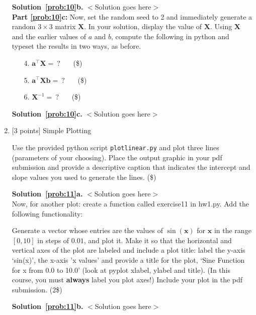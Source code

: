 \documentclass[10pt]{article}
\begin{document}
\begin{enumerate}
{\bf Solution~\ref{prob:10}b.} $<$Solution goes here$>$\\

{\bf Part \ref{prob:10}c:} Now, set the random seed to 2 and immediately generate a random $3 \times 3$ matrix $\mathbf{X}$.  In your solution, display the value of $\mathbf{X}$.  Using $\mathbf{X}$ and the earlier values of $a$ and $b$, compute the following in python and typeset the results in two ways, as before.
\begin{enumerate}
\item[4.] $\mathbf{a}^\top\mathbf{X} = ~?$ ~~~(\$)
\item[5.] $\mathbf{a}^\top\mathbf{X}\mathbf{b} = ~?$ ~~~(\$)
\item[6.] $\mathbf{X}^{-1} = ~?$ ~~~(\$)
\end{enumerate}

{\bf Solution~\ref{prob:10}c.} $<$Solution goes here$>$\\



\item \label{prob:11} [3 points] Simple Plotting

Use the provided python script {\tt plotlinear.py} and plot three lines (parameters of your choosing).  Place the output graphic in your pdf submission and provide a descriptive caption that indicates the intercept and slope values you used to generate the lines. (\$)

{\bf Solution~\ref{prob:11}a.} $<$Solution goes here$>$\\

Now, for another plot: create a function called exercise11 in hw1.py.  Add the following functionality:

Generate a vector whose entries are the values of $\sin(\mathbf{x})$ for $\mathbf{x}$ in the range $[0,10]$ in steps of $0.01$, and plot it.  Make it so that the horizontal and vertical axes of the plot are labeled and include a plot title: label the y-axis `sin(x)', the x-axis 'x values' and provide a title for the plot, `Sine Function for x from 0.0 to 10.0' (look at pyplot xlabel, ylabel and title).  (In this course, you must {\bf always} label you plot axes!)  Include your plot in the pdf submission. (2\$)

{\bf Solution~\ref{prob:11}b.} $<$Solution goes here$>$\\

\end{enumerate}
\end{document}
